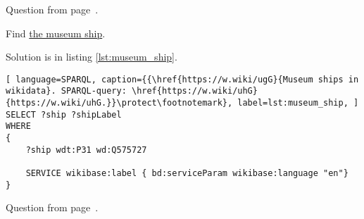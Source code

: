 \small{Question from page~\pageref{ship_tasks}.}

		
	
\begin{exercise}
	\label{answer:ship_ex_3}
	Find \href{https://en.wikipedia.org/wiki/List_of_museum_ships}{the museum ship}.
\end{exercise}

Solution is in listing \ref{lst:museum_ship}.

\begin{lstlisting}[ language=SPARQL, caption={{\href{https://w.wiki/ugG}{Museum ships in wikidata}. SPARQL-query: \href{https://w.wiki/uhG}{https://w.wiki/uhG.}}\protect\footnotemark}, label=lst:museum_ship, ]
SELECT ?ship ?shipLabel
WHERE
{
	?ship wdt:P31 wd:Q575727
			   
	SERVICE wikibase:label { bd:serviceParam wikibase:language "en"}
}
\end{lstlisting}

\small{Question from page~\pageref{ship_tasks}.}